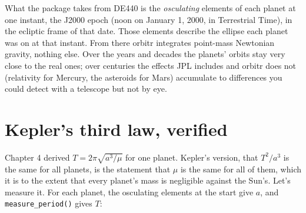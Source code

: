 \documentclass[
  10.5pt,
  letterpaper,
]{scrbook}
\theoremstyle{definition}
\theoremstyle{plain}
\theoremstyle{remark}
\begin{document}
What the package takes from DE440 is the \emph{osculating} elements of
each planet at one instant, the J2000 epoch (noon on January 1, 2000, in
Terrestrial Time), in the ecliptic frame of that date. Those elements
describe the ellipse each planet was on at that instant. From there
orbitr integrates point-mass Newtonian gravity, nothing else. Over the
years and decades the planets' orbits stay very close to the real ones;
over centuries the effects JPL includes and orbitr does not (relativity
for Mercury, the asteroids for Mars) accumulate to differences you could
detect with a telescope but not by eye.

\section{Kepler's third law, verified}\label{keplers-third-law-verified}

Chapter 4 derived \(T = 2\pi\sqrt{a^3/\mu}\) for one planet. Kepler's
version, that \(T^2/a^3\) is the same for all planets, is the statement
that \(\mu\) is the same for all of them, which it is to the extent that
every planet's mass is negligible against the Sun's. Let's measure it.
For each planet, the osculating elements at the start give \(a\), and
\texttt{measure\_period()} gives \(T\):
\end{document}
